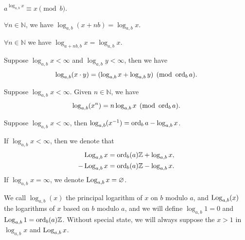 \begin{proposition}
    $a^{\log_{a, b}x} \equiv x \pmod{b}$.
\end{proposition}
\begin{proposition}
    $\forall n\in\mathbb{N}$, we have $\log_{a, b}(x + nb) = \log_{a,b}x$.
\end{proposition}
\begin{proposition}
    $\forall n \in \mathbb{N}$ we have $\log_{a+nb, b}x = \log_{a, b}x$.
\end{proposition}
\begin{proposition}
    Suppose $\log_{a, b}x < \infty$ and $\log_{a, b}y < \infty$, then we have
    \[ \log_{a, b}(x \cdot y) = (\log_{a, b}x + \log_{a, b}y) \pmod{\operatorname{ord}_{b}a}. \]
\end{proposition}
\begin{proposition}
    Suppose $\log_{a, b}x < \infty$.
    Given $n \in \mathbb{N}$, we have
    \[ \log_{a, b}(x ^{n}) = n\log_{a, b}x \pmod{\operatorname{ord}_{b}a}. \]
\end{proposition}
\begin{proposition}
    Suppose $\log_{a,b}x < \infty$, then $\log_{a, b}(x^{-1}) = \operatorname{ord}_{b}a - \log_{a,b}x$.
\end{proposition}
\begin{definition}\label{def:log-set-under-modulo}
If $\log_{a, b}x < \infty$, then we denote that
\begin{align*}
    \operatorname{Log}_{a, b}x &= \operatorname{ord}_b(a)\mathbb{Z} + \log_{a, b}x, \\
    - \operatorname{Log}_{a, b}x &= \operatorname{ord}_b(a)\mathbb{Z} - \log_{a, b}x.
\end{align*}
If $\log_{a, b}x = \infty$, we denote $\operatorname{Log}_{a, b}x = \varnothing$.
\end{definition}
We call $\log_{a, b}(x)$ the principal logarithm of $x$ on $b$ modulo $a$, and $\operatorname{Log}_{a, b}(x)$ the logarithms of $x$ based on $b$ modulo $a$, and we will define $\log_{a, b}1 = 0$ and $\operatorname{Log}_{a, b}1 = \operatorname{ord}_{b}(a)\mathbb{Z}$.
Without special state, we will always suppose the $x > 1$ in $\log_{a, b}x$ and $\operatorname{Log}_{a,b}x$.

